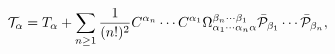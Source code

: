 \begin{equation}
{\cal T}_{\alpha}=T_{\alpha}+\sum_{n\ge1}\frac{1}{(n!)^{2}}C^{\alpha_{n}%
}\cdots C^{\alpha_{1}}\Omega_{\alpha_{1}\cdots\alpha_{n}\alpha}^{\beta
_{n}\cdots\beta_{1}}\bar{{\cal P}}_{\beta_{1}}\cdots\bar{{\cal P}%
}_{\beta_{n}},\label{2.10}%
\end{equation}%
